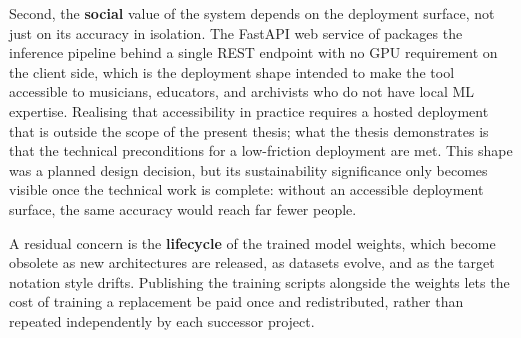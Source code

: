 Second, the \textbf{social} value of the system depends on the
deployment surface, not just on its accuracy in isolation.
The FastAPI web service of  packages the
inference pipeline behind a single REST endpoint with no GPU
requirement on the client side, which is the deployment shape
intended to make the tool accessible to musicians, educators, and
archivists who do not have local ML expertise.
Realising that accessibility in practice requires a hosted
deployment that is outside the scope of the present thesis; what
the thesis demonstrates is that the technical preconditions for a
low-friction deployment are met.
This shape was a planned design decision, but its sustainability
significance only becomes visible once the technical work is
complete: without an accessible deployment surface, the same accuracy
would reach far fewer people.

A residual concern is the \textbf{lifecycle} of the trained model
weights, which become obsolete as new architectures are released,
as datasets evolve, and as the target notation style drifts.
Publishing the training scripts alongside the weights lets the cost
of training a replacement be paid once and redistributed, rather
than repeated independently by each successor project.
